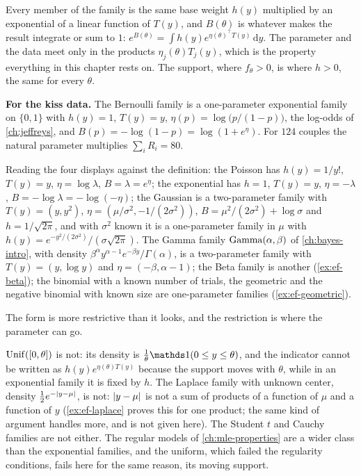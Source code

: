 \begin{inwords}
Every member of the family is the same base weight $h(y)$ multiplied by an exponential of a linear function of $T(y)$, and $B(\theta)$ is whatever makes the result integrate or sum to $1$: $e^{B(\theta)} = \int h(y)e^{\eta(\theta)^\top T(y)}\,\mathrm{d}y$. The parameter and the data meet only in the products $\eta_j(\theta)T_j(y)$, which is the property everything in this chapter rests on. The support, where $f_\theta > 0$, is where $h > 0$, the same for every $\theta$.

\textbf{For the kiss data.} The Bernoulli family is a one-parameter exponential family on $\{0, 1\}$ with $h(y) = 1$, $T(y) = y$, $\eta(p) = \log\big(p/(1-p)\big)$, the log-odds of \cref{ch:jeffreys}, and $B(p) = -\log(1 - p) = \log(1 + e^{\eta})$. For $124$ couples the natural parameter multiplies $\sum_i R_i = 80$.
\end{inwords}

Reading the four displays against the definition: the Poisson has $h(y) = 1/y!$, $T(y) = y$, $\eta = \log\lambda$, $B = \lambda = e^\eta$; the exponential has $h = 1$, $T(y) = y$, $\eta = -\lambda$, $B = -\log\lambda = -\log(-\eta)$; the Gaussian is a two-parameter family with $T(y) = (y, y^2)$, $\eta = (\mu/\sigma^2, -1/(2\sigma^2))$, $B = \mu^2/(2\sigma^2) + \log\sigma$ and $h = 1/\sqrt{2\pi}$, and with $\sigma^2$ known it is a one-parameter family in $\mu$ with $h(y) = e^{-y^2/(2\sigma^2)}/(\sigma\sqrt{2\pi})$.
The Gamma family $\mathrm{Gamma}(\alpha, \beta)$ of \cref{ch:bayes-intro}, with density $\beta^\alpha y^{\alpha - 1}e^{-\beta y}/\Gamma(\alpha)$, is a two-parameter family with $T(y) = (y, \log y)$ and $\eta = (-\beta, \alpha - 1)$; the Beta family is another (\cref{ex:ef-beta}); the binomial with a known number of trials, the geometric and the negative binomial with known size are one-parameter families (\cref{ex:ef-geometric}).

The form is more restrictive than it looks, and the restriction is where the parameter can go.

\begin{pitfall}
$\mathrm{Unif}([0, \theta])$ is not: its density is $\frac1\theta\ind(0 \leq y \leq \theta)$, and the indicator cannot be written as $h(y)e^{\eta(\theta)T(y)}$ because the support moves with $\theta$, while in an exponential family it is fixed by $h$. The Laplace family with unknown center, density $\frac12e^{-\lvert y - \mu\rvert}$, is not: $\lvert y - \mu\rvert$ is not a sum of products of a function of $\mu$ and a function of $y$ (\cref{ex:ef-laplace} proves this for one product; the same kind of argument handles more, and is not given here). The Student $t$ and Cauchy families are not either. The regular models of \cref{ch:mle-properties} are a wider class than the exponential families, and the uniform, which failed the regularity conditions, fails here for the same reason, its moving support.
\end{pitfall}

